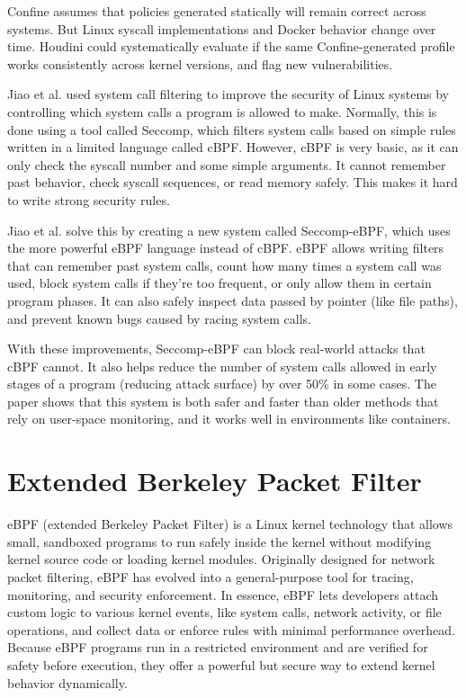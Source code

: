 \begin{doublespace}
Confine assumes that policies generated statically will remain correct across systems. But Linux syscall implementations and Docker behavior change over time. Houdini could systematically evaluate if the same Confine-generated profile works consistently across kernel versions, and flag new vulnerabilities.

Jiao et al. \cite{jia2023programmable} used system call filtering to improve the security of Linux systems by controlling which system calls a program is allowed to make. Normally, this is done using a tool called Seccomp, which filters system calls based on simple rules written in a limited language called cBPF. However, cBPF is very basic, as it can only check the syscall number and some simple arguments. It cannot remember past behavior, check syscall sequences, or read memory safely. This makes it hard to write strong security rules.

Jiao et al. \cite{jia2023programmable} solve this by creating a new system called Seccomp-eBPF, which uses the more powerful eBPF language instead of cBPF. eBPF allows writing filters that can remember past system calls, count how many times a system call was used, block system calls if they’re too frequent, or only allow them in certain program phases. It can also safely inspect data passed by pointer (like file paths), and prevent known bugs caused by racing system calls.

With these improvements, Seccomp-eBPF can block real-world attacks that cBPF cannot. It also helps reduce the number of system calls allowed in early stages of a program (reducing attack surface) by over 50\% in some cases. The paper shows that this system is both safer and faster than older methods that rely on user-space monitoring, and it works well in environments like containers.


\section{Extended Berkeley Packet Filter}


eBPF (extended Berkeley Packet Filter) is a Linux kernel technology that allows small, sandboxed programs to run safely inside the kernel without modifying kernel source code or loading kernel modules. Originally designed for network packet filtering, eBPF has evolved into a general-purpose tool for tracing, monitoring, and security enforcement. In essence, eBPF lets developers attach custom logic to various kernel events, like system calls, network activity, or file operations, and collect data or enforce rules with minimal performance overhead. Because eBPF programs run in a restricted environment and are verified for safety before execution, they offer a powerful but secure way to extend kernel behavior dynamically.



\end{doublespace}
